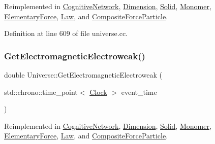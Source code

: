 Reimplemented in \mbox{\hyperlink{class_cognitive_network_a09e5a1c774c84529a7adfe56fadb7467}{Cognitive\+Network}}, \mbox{\hyperlink{class_dimension_a21783c29a576518b722512f1245fa598}{Dimension}}, \mbox{\hyperlink{class_solid_a01cd3c441a4e339927c43536de6d9b5e}{Solid}}, \mbox{\hyperlink{class_monomer_ad23f4829d66cb20401cc72a9d72ac320}{Monomer}}, \mbox{\hyperlink{class_elementary_force_a2c8bc3226f42710717775c73eee1644e}{Elementary\+Force}}, \mbox{\hyperlink{class_law_a01eba6e68d2d8a717e2b4789be90853d}{Law}}, and \mbox{\hyperlink{class_composite_force_particle_a8ef336fed7e33d52a3baae4bd4dd32fd}{Composite\+Force\+Particle}}.



Definition at line 609 of file universe.\+cc.

\mbox{\label{class_universe_a9f099605c082e7fa755787a6a8cab7ba}} 
\subsubsection{\texorpdfstring{Get\+Electromagnetic\+Electroweak()}{GetElectromagneticElectroweak()}}
{\footnotesize\ttfamily double Universe\+::\+Get\+Electromagnetic\+Electroweak (\begin{DoxyParamCaption}\item[{std\+::chrono\+::time\+\_\+point$<$ \mbox{\hyperlink{universe_8h_a0ef8d951d1ca5ab3cfaf7ab4c7a6fd80}{Clock}} $>$}]{event\+\_\+time }\end{DoxyParamCaption})\hspace{0.3cm}{\ttfamily [virtual]}}



Reimplemented in \mbox{\hyperlink{class_cognitive_network_a8c4e0454068f714691ae250f795cdb67}{Cognitive\+Network}}, \mbox{\hyperlink{class_dimension_ae1babb1fa280c35966d7ee3de6655e4d}{Dimension}}, \mbox{\hyperlink{class_solid_aff7ec13bcc584d8330e3f3a1b371bbe6}{Solid}}, \mbox{\hyperlink{class_monomer_a9b270cd1293bc9635813ead284bd3881}{Monomer}}, \mbox{\hyperlink{class_elementary_force_a58e503f2f3a7410f034a2a04bca560d1}{Elementary\+Force}}, \mbox{\hyperlink{class_law_ae4ccaca7b78905f416f35f9556b1923c}{Law}}, and \mbox{\hyperlink{class_composite_force_particle_ac26d7aab0daefcf13c68aba9e0f2ed53}{Composite\+Force\+Particle}}.



